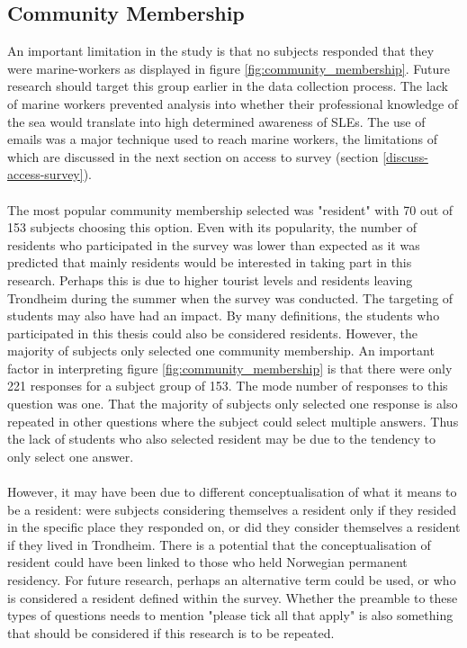 \paragraph{}


\subsection{Community Membership} \label{discuss-comm-membership}
An important limitation in the study is that no subjects responded that they were marine-workers as displayed in figure \ref{fig:community_membership}. Future research should target this group earlier in the data collection process. The lack of marine workers prevented analysis into whether their professional knowledge of the sea would translate into high determined awareness of SLEs. The use of emails was a major technique used to reach marine workers, the limitations of which are discussed in the next section on access to survey (section \ref{discuss-access-survey}). 

\paragraph{}
The most popular community membership selected was "resident" with 70 out of 153 subjects choosing this option. Even with its popularity, the number of residents who participated in the survey was lower than expected as it was predicted that mainly residents would be interested in taking part in this research. 
Perhaps this is due to higher tourist levels and residents leaving Trondheim during the summer when the survey was conducted. The targeting of students may also have had an impact. By many definitions, the students who participated in this thesis could also be considered residents. However, the majority of subjects only selected one community membership. An important factor in interpreting figure \ref{fig:community_membership} is that there were only 221 responses for a subject group of 153. The mode number of responses to this question was one. That the majority of subjects only selected one response is also repeated in other questions where the subject could select multiple answers. Thus the lack of students who also selected resident may be due to the tendency to only select one answer. 
\paragraph{}

However, it may have been due to different conceptualisation of what it means to be a resident: were subjects considering themselves a resident only if they resided in the specific place they responded on, or did they consider themselves a resident if they lived in Trondheim. There is a potential that the conceptualisation of resident could have been linked to those who held Norwegian permanent residency. For future research, perhaps an alternative term could be used, or who is considered a resident defined within the survey. Whether the preamble to these types of questions needs to mention "please tick all that apply" is also something that should be considered if this research is to be repeated. 
